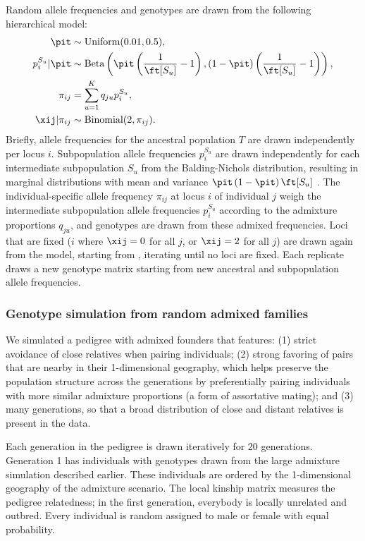 \documentclass[11pt]{article}
\begin{document}
Random allele frequencies and genotypes are drawn from the following hierarchical model:
\begin{align*}
  \pit
  &\sim
    \text{Uniform}( 0.01, 0.5 )
    , \\
  p_i^{S_u} | \pit
  &\sim
    \text{Beta} \left(
    \pit \left( \frac{1}{ \ft[S_u] } - 1 \right),
    \left( 1 - \pit \right) \left( \frac{1}{ \ft[S_u] } - 1 \right)
    \right)
    , \\
  \pi_{ij}
  &=
    \sum_{u = 1}^K q_{ju} p_i^{S_u}
    , \\
  \xij | \pi_{ij}
  &\sim
    \text{Binomial}(2, \pi_{ij})
    .
\end{align*}
Briefly, allele frequencies \pit for the ancestral population $T$ are drawn independently per locus $i$.
Subpopulation allele frequencies $p_i^{S_u}$ are drawn independently for each intermediate subpopulation $S_u$ from the Balding-Nichols distribution, resulting in marginal distributions with mean \pit and variance $\pit \left( 1 - \pit \right) \ft[S_u]$ \citep{balding_method_1995}.
The individual-specific allele frequency $\pi_{ij}$ at locus $i$ of individual $j$ weigh the intermediate subpopulation allele frequencies $p_i^{S_u}$ according to the admixture proportions $q_{ju}$, and genotypes are drawn from these admixed frequencies.
Loci that are fixed ($i$ where $\xij = 0$ for all $j$, or $\xij = 2$ for all $j$) are drawn again from the model, starting from \pit, iterating until no loci are fixed.
Each replicate draws a new genotype matrix starting from new ancestral and subpopulation allele frequencies.

\subsubsection{Genotype simulation from random admixed families}

We simulated a pedigree with admixed founders that features:
(1) strict avoidance of close relatives when pairing individuals;
(2) strong favoring of pairs that are nearby in their 1-dimensional geography, which helps preserve the population structure across the generations by preferentially pairing individuals with more similar admixture proportions (a form of assortative mating); and
(3) many generations, so that a broad distribution of close and distant relatives is present in the data.

Each generation in the pedigree is drawn iteratively for 20 generations.
Generation 1 has individuals with genotypes drawn from the large admixture simulation described earlier.
These individuals are ordered by the 1-dimensional geography of the admixture scenario.
The local kinship matrix measures the pedigree relatedness; in the first generation, everybody is locally unrelated and outbred.
Every individual is random assigned to male or female with equal probability.
\end{document}
